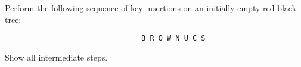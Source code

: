 Perform the following sequence of key insertions on an initially
empty red-black tree:
{\tt

\begin{verbatim}
                                B R O W N U C S

\end{verbatim}
}
Show all intermediate steps.
